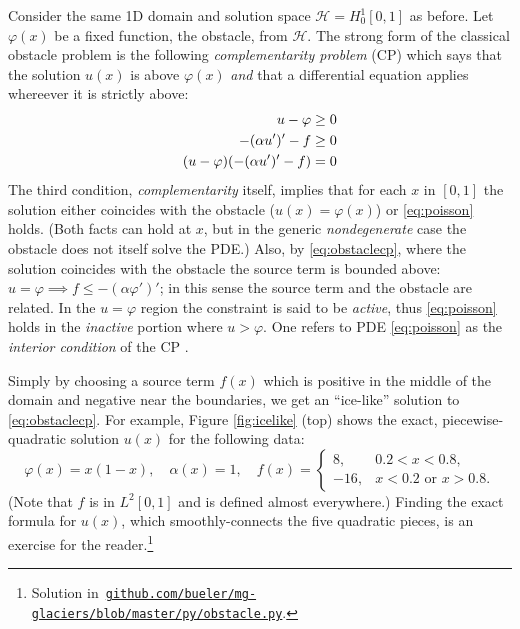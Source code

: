 \documentclass[letterpaper,final,12pt,reqno]{amsart}
\theoremstyle{claim}
\numberwithin{equation}{section}
\numberwithin{figure}{section}
\numberwithin{table}{section}
\numberwithin{theorem}{section}
\begin{document}
Consider the same 1D domain and solution space $\mathcal{H}=H_0^1[0,1]$ as before.  Let $\varphi(x)$ be a fixed function, the obstacle, from $\mathcal{H}$.  The strong form of the classical obstacle problem is the following \emph{complementarity problem} (CP) \cite{Bueler2021,KinderlehrerStampacchia1980} which says that the solution $u(x)$ is above $\varphi(x)$ \emph{and} that a differential equation applies whereever it is strictly above:
\begin{align}
  u - \varphi &\ge 0 \label{eq:obstaclecp} \\
  -(\alpha u')'-f &\ge 0 \notag \\
  (u-\varphi)(-(\alpha u')'-f) &= 0 \notag
\end{align}
The third condition, \emph{complementarity} itself, implies that for each $x$ in $[0,1]$ the solution either coincides with the obstacle ($u(x)=\varphi(x)$) or \eqref{eq:poisson} holds.  (Both facts can hold at $x$, but in the generic \emph{nondegenerate} \cite{KinderlehrerStampacchia1980} case the obstacle does not itself solve the PDE.)  Also, by \eqref{eq:obstaclecp}, where the solution coincides with the obstacle the source term is bounded above: $u=\varphi \implies f \le -(\alpha\varphi')'$; in this sense the source term and the obstacle are related.  In the $u=\varphi$ region the constraint is said to be \emph{active}, thus \eqref{eq:poisson} holds in the \emph{inactive} portion where $u>\varphi$.  One refers to PDE \eqref{eq:poisson} as the \emph{interior condition} of the CP \cite{KinderlehrerStampacchia1980}.

Simply by choosing a source term $f(x)$ which is positive in the middle of the domain and negative near the boundaries, we get an ``ice-like'' solution to \eqref{eq:obstaclecp}.  For example, Figure \ref{fig:icelike} (top) shows the exact, piecewise-quadratic solution $u(x)$ for the following data:
\begin{equation}
\varphi(x) = x(1-x), \quad \alpha(x)=1, \quad f(x) = \begin{cases} 8, & 0.2 < x < 0.8, \\
                                                                 -16, & x<0.2 \text{ or } x>0.8. \end{cases}  \label{eq:icelikedetails}
\end{equation}
(Note that $f$ is in $L^2[0,1]$ and is defined almost everywhere.)  Finding the exact formula for $u(x)$, which smoothly-connects the five quadratic pieces, is an exercise for the reader.\footnote{Solution in\, \href{https://github.com/bueler/mg-glaciers/blob/master/py/obstacle.py}{\texttt{github.com/bueler/mg-glaciers/blob/master/py/obstacle.py}}.}
\end{document}
